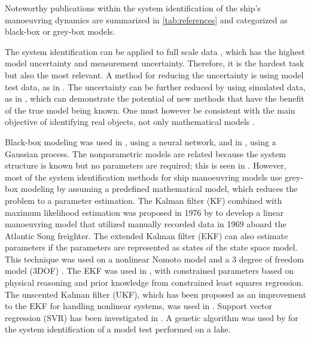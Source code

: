 Noteworthy publications within the system identification of the ship's manoeuvring dynamics are summarized in \autoref{tab:references} and categorized as black-box or grey-box models.
 
\noindent The system identification can be applied to full scale data \cite{astrom_identification_1976,revestido_herrero_two-step_2012,perera_system_2015}, which has the highest model uncertainty and measurement uncertainty. Therefore, it is the hardest task but also the most relevant. A method for reducing the uncertainty is using model test data, as in \cite{araki_estimating_2012,luo_parameter_2016,xue_identification_2021,miller_ship_2021, he_nonparametric_2022}. The uncertainty can be further reduced by using simulated data, as in \cite{shi_identification_2009,zhu_parameter_2017,wang_parameter_2021}, which can demonstrate the potential of new methods that have the benefit of the true model being known. One must however be consistent with the main objective of identifying real objects, not only mathematical models \cite{miller_ship_2021}.

\noindent Black-box modeling was used in \textcite{he_nonparametric_2022}, using a neural network, and in \textcite{xue_identification_2021}, using a Gaussian process. The nonparametric models are related because the system structure is known but no parameters are required; this is seen in \textcite{pongduang_nonparametric_2020}. However, most of the system identification methods for ship manoeuvring models use grey-box modeling by assuming a predefined mathematical model, which reduces the problem to a parameter estimation.
The Kalman filter (KF) combined with maximum likelihood estimation was proposed in 1976 by \textcite{astrom_identification_1976} to develop a linear manoeuvring model that utilized manually recorded data in 1969 aboard the Atlantic Song freighter. The extended Kalman filter (EKF) can also estimate parameters if the parameters are represented as states of the state space model. This technique was used on a nonlinear Nomoto model \cite{perera_system_2015} and a 3 degree of freedom model (3DOF) \cite{shi_identification_2009}. The EKF was used in \textcite{araki_estimating_2012}, with constrained parameters based on physical reasoning and prior knowledge from constrained least squares regression. The unscented Kalman filter (UKF), which has been proposed as an improvement to the EKF for handling nonlinear systems, was used in \textcite{revestido_herrero_two-step_2012}.
Support vector regression (SVR) has been investigated in \cite{luo_parameter_2016,zhu_parameter_2017, wang_parameter_2021}. A genetic algorithm was used by \textcite{miller_ship_2021} for the system identification of a model test performed on a lake.





